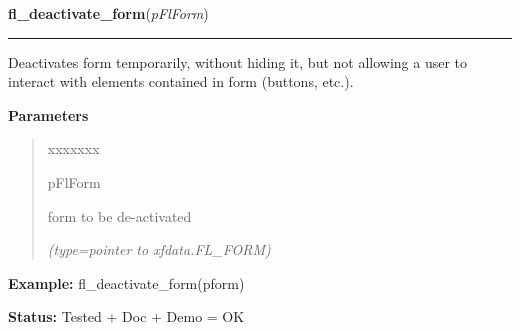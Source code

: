     \label{xformslib:flbasic:fl_deactivate_form}

    \vspace{0.5ex}

\hspace{.8\funcindent}\begin{boxedminipage}{\funcwidth}

    \raggedright \textbf{fl\_deactivate\_form}(\textit{pFlForm})

    \vspace{-1.5ex}

    \rule{\textwidth}{0.5\fboxrule}
\setlength{\parskip}{2ex}
    Deactivates form temporarily, without hiding it, but not allowing a 
    user to interact with elements contained in form (buttons, etc.).

\setlength{\parskip}{1ex}
      \textbf{Parameters}
      \vspace{-1ex}

      \begin{quote}
        \begin{Ventry}{xxxxxxx}

          \item[pFlForm]

          form to be de-activated

            {\it (type=pointer to xfdata.FL\_FORM)}

        \end{Ventry}

      \end{quote}

\textbf{Example:} fl\_deactivate\_form(pform)



\textbf{Status:} Tested + Doc + Demo = OK



    \end{boxedminipage}

    \label{xformslib:flbasic:fl_activate_form}

    \vspace{0.5ex}

